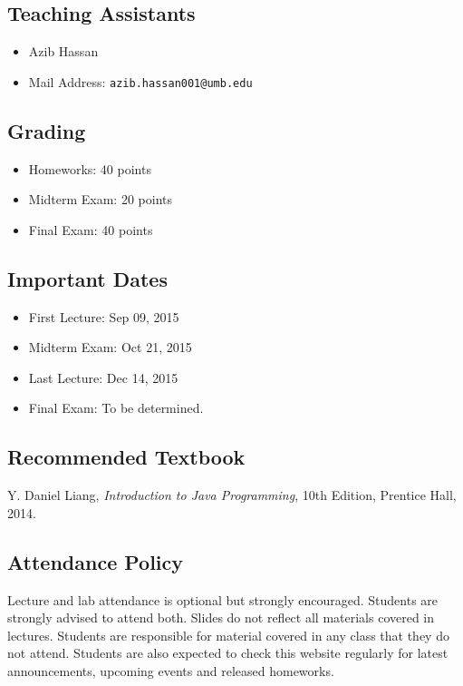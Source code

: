 \documentclass[12pt,letterpaper,twoside]{article}
\begin{document}
\subsection*{Teaching Assistants}
\begin{itemize}
\item[] Azib Hassan
\item[] Mail Address: \texttt{azib.hassan001@umb.edu}
\end{itemize}

\subsection*{Grading}
\begin{itemize}
\item[] Homeworks: 40 points
\item[] Midterm Exam: 20 points
\item[] Final Exam: 40 points
\end{itemize}

\subsection*{Important Dates}
\begin{itemize}
\item[] First Lecture: Sep 09, 2015
\item[] Midterm Exam: Oct 21, 2015
\item[] Last Lecture: Dec 14, 2015
\item[] Final Exam: To be determined.
\end{itemize}

\subsection*{Recommended Textbook}
Y. Daniel Liang, \textit{Introduction to Java Programming}, 10th Edition, Prentice Hall, 2014.

\subsection*{Attendance Policy}
Lecture and lab attendance is optional but strongly encouraged. Students are strongly advised to attend both. Slides do not reﬂect all materials covered in lectures. Students are responsible for material covered in any class that they do not attend. Students are also expected to check this website regularly for latest announcements, upcoming events and released homeworks.
\end{document}
